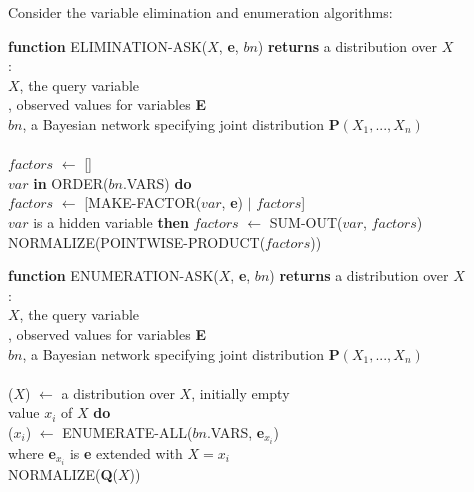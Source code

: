 
Consider the variable elimination and enumeration algorithms:

{\bf function} ELIMINATION-ASK($X$, {\bf e}, $bn$) {\bf returns} a distribution over $X$\\
\indent\hspace{0.5cm}{\bf inputs}:\\
\indent\hspace{1.5cm}$X$, the query variable\\
\indent\hspace{1.5cm}{\bf e}, observed values for variables {\bf E}\\
\indent\hspace{1.5cm}$bn$, a Bayesian network specifying joint distribution {\bf P}$(X_1,...,X_n)$\\
\\\indent\hspace{0.5cm}$factors$ $\leftarrow$ {[}{]} \\
\indent\hspace{0.5cm}{\bf for each} $var$ {\bf in} ORDER($bn$.VARS) {\bf do}\\
\indent\hspace{1.0cm}$factors$ $\leftarrow$ {[}MAKE-FACTOR($var$, {\bf e}) $\mid$ $factors${]}\\
\indent\hspace{1.0cm}{\bf if} $var$ is a hidden variable {\bf then} $factors$ $\leftarrow$ SUM-OUT($var$, $factors$)\\
\indent\hspace{0.5cm}{\bf return} NORMALIZE(POINTWISE-PRODUCT($factors$))

\vspace{1cm}
{\bf function} ENUMERATION-ASK($X$, {\bf e}, $bn$) {\bf returns} a distribution over $X$\\
\indent\hspace{0.5cm}{\bf inputs}:\\
\indent\hspace{1.5cm}$X$, the query variable\\
\indent\hspace{1.5cm}{\bf e}, observed values for variables {\bf E}\\
\indent\hspace{1.5cm}$bn$, a Bayesian network specifying joint distribution {\bf P}$(X_1,...,X_n)$\\
\\\indent\hspace{0.5cm}{\bf Q}($X$) $\leftarrow$ a distribution over $X$, initially empty\\
\indent\hspace{0.5cm}{\bf for each} value $x_i$ of $X$ {\bf do}\\
\indent\hspace{1.0cm}{\bf Q}($x_i$) $\leftarrow$ ENUMERATE-ALL($bn$.VARS, {\bf e}$_{x_i}$)\\
\indent\hspace{1.5cm}where {\bf e}$_{x_i}$ is {\bf e} extended with $X = x_i$\\
\indent\hspace{0.5cm}{\bf return} NORMALIZE({\bf Q}($X$))\\

